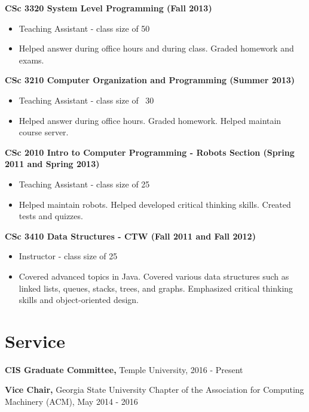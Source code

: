 \documentclass{res}
\begin{document}
\begin{resume}
{\bf CSc 3320  System Level Programming (Fall 2013)}
    \begin{itemize}
    \item Teaching Assistant - class size of 50
      \item Helped answer during office hours and during class.  Graded homework and exams.  
    \end{itemize}


{\bf CSc 3210 Computer Organization and Programming (Summer 2013)}
    \begin{itemize}
    \item Teaching Assistant - class size of ~30
      \item Helped answer during office hours.  Graded homework.  Helped maintain course server.
    \end{itemize}



{\bf CSc 2010 Intro to Computer Programming - Robots Section (Spring 2011 and Spring 2013) }
    \begin{itemize}
      \item Teaching Assistant - class size of 25
      \item Helped maintain robots.  Helped developed critical thinking skills.  Created tests and quizzes.
    \end{itemize}


{\bf CSc 3410 Data Structures  - CTW (Fall 2011 and  Fall 2012) }
    \begin{itemize}
    \item Instructor - class size of 25
      \item Covered advanced topics in Java.  Covered various data structures such as linked lists, queues, stacks, trees, and graphs.  Emphasized critical thinking skills and object-oriented design.
    \end{itemize}

\newpage
\section{Service}


\textbf{CIS Graduate Committee,} Temple University, 2016 - Present

{\bf Vice Chair,} Georgia State University Chapter of the Association for Computing Machinery (ACM),  May 2014 - 2016


\end{resume}
\end{document}
